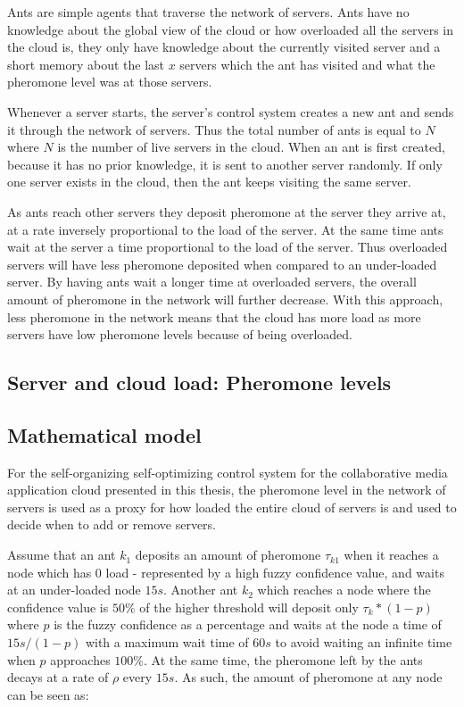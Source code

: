 Ants are simple agents that traverse the network of servers. Ants have no knowledge about the global view of the cloud or how overloaded all the servers in the cloud is, they only have knowledge about the currently visited server and a short memory about the last $x$ servers which the ant has visited and what the pheromone level was at those servers.

Whenever a server starts, the server's control system creates a new ant and sends it through the network of servers. Thus the total number of ants is equal to $N$ where $N$ is the number of live servers in the cloud. When an ant is first created, because it has no prior knowledge, it is sent to another server randomly. If only one server exists in the cloud, then the ant keeps visiting the same server.

As ants reach other servers they deposit pheromone at the server they arrive at, at a rate inversely proportional to the load of the server. At the same time ants wait at the server a time proportional to the load of the server. Thus overloaded servers will have less pheromone deposited when compared to an under-loaded server. By having ants wait a longer time at overloaded servers, the overall amount of pheromone in the network will further decrease. With this approach, less pheromone in the network means that the cloud has more load as more servers have low pheromone levels because of being overloaded.

\subsection{Server and cloud load: Pheromone levels}

\subsection{Mathematical model}


For the self-organizing self-optimizing control system for the collaborative media application cloud presented in this thesis, the pheromone level in the network of servers is used as a proxy for how loaded the entire cloud of servers is and used to decide when to add or remove servers. 

Assume that an ant $k_{1}$ deposits an amount of pheromone $\tau_{k1}$ when it reaches a node which has 0 load - represented by a high fuzzy confidence value, and waits at an under-loaded node $15s$. Another ant $k_{2}$ which reaches a node where the confidence value is $50\%$ of the higher threshold will deposit only $\tau_{k} * (1 - p)$ where $p$ is the fuzzy confidence as a percentage and waits at the node a time of $15s/(1-p)$ with a maximum wait time of $60s$ to avoid waiting an infinite time when $p$ approaches $100\%$. At the same time, the pheromone left by the ants decays at a rate of $\rho$ every $15s$. As such, the amount of pheromone at any node can be seen as:

